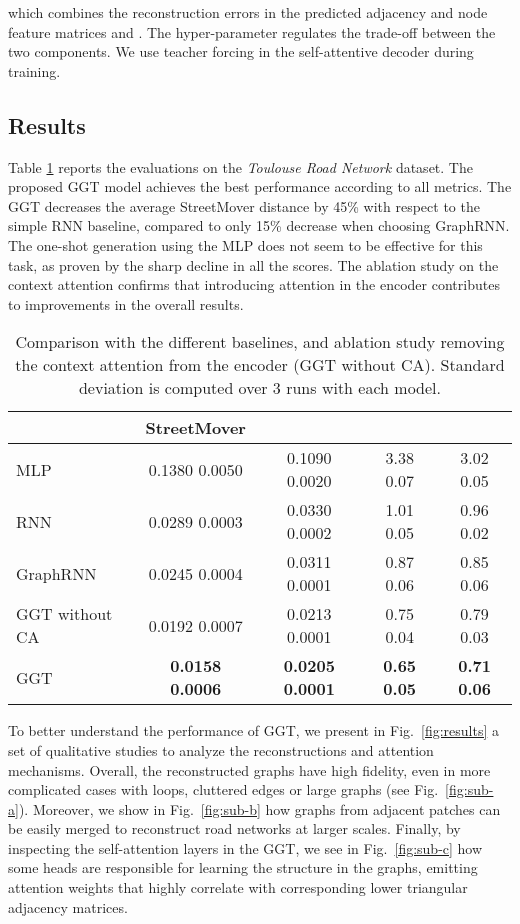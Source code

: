 \documentclass{article}
\begin{document}
which combines the reconstruction errors in the predicted adjacency and node feature matrices  and . The hyper-parameter  regulates the trade-off between the two components. We use teacher forcing in the self-attentive decoder during training.
\vskip -0.05in

\subsection{Results}
\vskip -0.05in

Table \ref{table:results} reports the evaluations on the \textit{Toulouse Road Network} dataset. The proposed GGT model achieves the best performance according to all metrics. The GGT decreases the average StreetMover distance by 45\% with respect to the simple RNN baseline, compared to only 15\% decrease when choosing GraphRNN. The one-shot generation using the MLP does not seem to be effective for this task, as proven by the sharp decline in all the scores. The ablation study on the context attention confirms that introducing attention in the encoder contributes to improvements in the overall results.

\begin{table}[h!]
\centering
\vskip -0.15in
\caption{Comparison with the different baselines, and ablation study removing the context attention from the encoder (GGT \footnotesize{without} \fontsize{10}{11}\selectfont CA). Standard deviation is computed over 3 runs with each model.}
\begin{tabular}{l|cccc}
    \toprule
  & StreetMover &   &   &  \\
    \midrule
    MLP & 0.1380  0.0050 & 0.1090  0.0020 & 3.38  0.07 & 3.02    0.05  \\
    RNN & 0.0289  0.0003 & 0.0330  0.0002 & 1.01  0.05 &  0.96   0.02  \\
    GraphRNN & 0.0245  0.0004 & 0.0311  0.0001 & 0.87  0.06 & 0.85  0.06  \\
    \midrule
    GGT \footnotesize{without} \fontsize{10}{11}\selectfont CA & 0.0192  0.0007 &  0.0213  0.0001 & 0.75  0.04  & 0.79  0.03  \\
    GGT &\textbf{0.0158}  \textbf{0.0006}   &  \textbf{0.0205}  \textbf{0.0001} &  \textbf{0.65}  \textbf{0.05} & \textbf{0.71}  \textbf{0.06}    \\
    \bottomrule
    \end{tabular}
\vskip -0.05in
\label{table:results}
\end{table}

To better understand the performance of GGT, we present in Fig.~\ref{fig:results} a set of qualitative studies to analyze the reconstructions and attention mechanisms. Overall, the reconstructed graphs have high fidelity, even in more complicated cases with loops, cluttered edges or large graphs (see Fig.~\ref{fig:sub-a}). Moreover, we show in Fig.~\ref{fig:sub-b} how graphs from adjacent patches can be easily merged to reconstruct road networks at larger scales. Finally, by inspecting the self-attention layers in the GGT, we see in Fig.~\ref{fig:sub-c} how some heads are responsible for learning the structure in the graphs, emitting attention weights that highly correlate with corresponding lower triangular adjacency matrices.
\end{document}
